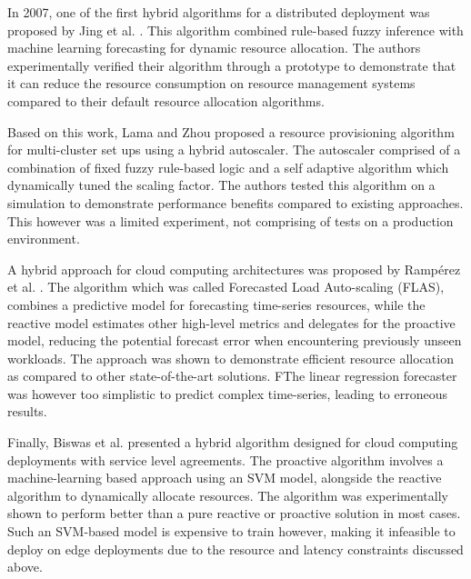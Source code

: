 In 2007, one of the first hybrid algorithms for a distributed deployment was proposed by Jing et al. \cite{xu2007use}. This algorithm combined rule-based fuzzy inference with machine learning forecasting for dynamic resource allocation. The authors experimentally verified their algorithm through a prototype to demonstrate that it can reduce the resource consumption on resource management systems compared to their default resource allocation algorithms.\par

Based on this work, Lama and Zhou \cite{lama2009efficient} proposed a resource provisioning algorithm for multi-cluster set ups using a hybrid autoscaler. The autoscaler comprised of a combination of fixed fuzzy rule-based logic and a self adaptive algorithm which dynamically tuned the scaling factor. The authors tested this algorithm on a simulation to demonstrate performance benefits compared to existing approaches. This however was a limited experiment, not comprising of tests on a production environment.\par

A hybrid approach for cloud computing architectures was proposed by Ramp{\'e}rez et al. \cite{ramperez2021flas}. The algorithm which was called Forecasted Load Auto-scaling (FLAS), combines a predictive model for forecasting time-series resources, while the reactive model estimates other high-level metrics and delegates for the proactive model, reducing the potential forecast error when encountering previously unseen workloads. The approach was shown to demonstrate efficient resource allocation as compared to other state-of-the-art solutions. FThe linear regression forecaster was however too simplistic to predict complex time-series, leading to erroneous results.\par

Finally, Biswas et al. \cite{biswas2017hybrid} presented a hybrid algorithm designed for cloud computing deployments with service level agreements. The proactive algorithm involves a machine-learning based approach using an SVM model, alongside the reactive algorithm to dynamically allocate resources. The algorithm was experimentally shown to perform better than a pure reactive or proactive solution in most cases. Such an SVM-based model is expensive to train however, making it infeasible to deploy on edge deployments due to the resource and latency constraints discussed above.\par

